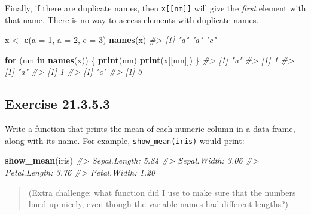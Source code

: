 \documentclass[]{book}
\newenvironment{Shaded}{\begin{snugshade}}{\end{snugshade}}
\newcommand{\CommentTok}[1]{\textcolor[rgb]{0.56,0.35,0.01}{\textit{#1}}}
\newcommand{\ControlFlowTok}[1]{\textcolor[rgb]{0.13,0.29,0.53}{\textbf{#1}}}
\newcommand{\DataTypeTok}[1]{\textcolor[rgb]{0.13,0.29,0.53}{#1}}
\newcommand{\DecValTok}[1]{\textcolor[rgb]{0.00,0.00,0.81}{#1}}
\newcommand{\KeywordTok}[1]{\textcolor[rgb]{0.13,0.29,0.53}{\textbf{#1}}}
\newcommand{\NormalTok}[1]{#1}
\newcommand{\StringTok}[1]{\textcolor[rgb]{0.31,0.60,0.02}{#1}}
\theoremstyle{plain}
\theoremstyle{remark}
\begin{document}
Finally, if there are duplicate names, then \texttt{x{[}{[}nm{]}{]}}
will give the \emph{first} element with that name. There is no way to
access elements with duplicate names.

\begin{Shaded}
\begin{Highlighting}[]
\NormalTok{x <-}\StringTok{ }\KeywordTok{c}\NormalTok{(}\DataTypeTok{a =} \DecValTok{1}\NormalTok{, }\DataTypeTok{a =} \DecValTok{2}\NormalTok{, }\DataTypeTok{c =} \DecValTok{3}\NormalTok{)}
\KeywordTok{names}\NormalTok{(x)}
\CommentTok{#> [1] "a" "a" "c"}
\end{Highlighting}
\end{Shaded}

\begin{Shaded}
\begin{Highlighting}[]
\ControlFlowTok{for}\NormalTok{ (nm }\ControlFlowTok{in} \KeywordTok{names}\NormalTok{(x)) \{}
  \KeywordTok{print}\NormalTok{(nm)}
  \KeywordTok{print}\NormalTok{(x[[nm]])}
\NormalTok{\}}
\CommentTok{#> [1] "a"}
\CommentTok{#> [1] 1}
\CommentTok{#> [1] "a"}
\CommentTok{#> [1] 1}
\CommentTok{#> [1] "c"}
\CommentTok{#> [1] 3}
\end{Highlighting}
\end{Shaded}

\hypertarget{exercise-21.3.5.3}{%
\subsection*{\texorpdfstring{Exercise
{21.3.5.3}}{Exercise 21.3.5.3}}\label{exercise-21.3.5.3}}

Write a function that prints the mean of each numeric column in a data
frame, along with its name. For example, \texttt{show\_mean(iris)} would
print:

\begin{Shaded}
\begin{Highlighting}[]
\KeywordTok{show_mean}\NormalTok{(iris)}
\CommentTok{#> Sepal.Length: 5.84}
\CommentTok{#> Sepal.Width:  3.06}
\CommentTok{#> Petal.Length: 3.76}
\CommentTok{#> Petal.Width:  1.20}
\end{Highlighting}
\end{Shaded}

\begin{quote}
(Extra challenge: what function did I use to make sure that the numbers
lined up nicely, even though the variable names had different lengths?)
\end{quote}
\end{document}
